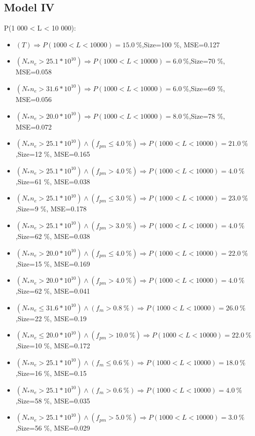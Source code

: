 \documentclass[numbered]{CSL}
\begin{document}
\subsection{Model IV}
P(1 000 < L < 10 000):
\begin{itemize}
\item $(T) \Rightarrow P(1 000 < L < 10 000) = 15.0~\%$,\hfill Size=100 \%, MSE=0.127
\item $(N_* n_e > 25.1 * 10^{10}) \Rightarrow P(1 000 < L < 10 000) = 6.0~\%$,\hfill Size=70 \%, MSE=0.058
\item $(N_* n_e > 31.6 * 10^{10}) \Rightarrow P(1 000 < L < 10 000) = 6.0~\%$,\hfill Size=69 \%, MSE=0.056
\item $(N_* n_e > 20.0 * 10^{10}) \Rightarrow P(1 000 < L < 10 000) = 8.0~\%$,\hfill Size=78 \%, MSE=0.072
\item $(N_* n_e > 25.1 * 10^{10}) \land (f_{pm} \leq 4.0~\%) \Rightarrow P(1 000 < L < 10 000) = 21.0~\%$,\hfill Size=12 \%, MSE=0.165
\item $(N_* n_e > 25.1 * 10^{10}) \land (f_{pm} > 4.0~\%) \Rightarrow P(1 000 < L < 10 000) = 4.0~\%$,\hfill Size=61 \%, MSE=0.038
\item $(N_* n_e > 25.1 * 10^{10}) \land (f_{pm} \leq 3.0~\%) \Rightarrow P(1 000 < L < 10 000) = 23.0~\%$,\hfill Size=9 \%, MSE=0.178
\item $(N_* n_e > 25.1 * 10^{10}) \land (f_{pm} > 3.0~\%) \Rightarrow P(1 000 < L < 10 000) = 4.0~\%$,\hfill Size=62 \%, MSE=0.038
\item $(N_* n_e > 20.0 * 10^{10}) \land (f_{pm} \leq 4.0~\%) \Rightarrow P(1 000 < L < 10 000) = 22.0~\%$,\hfill Size=15 \%, MSE=0.169
\item $(N_* n_e > 20.0 * 10^{10}) \land (f_{pm} > 4.0~\%) \Rightarrow P(1 000 < L < 10 000) = 4.0~\%$,\hfill Size=62 \%, MSE=0.041
\item $(N_* n_e \leq 31.6 * 10^{10}) \land (f_m > 0.8~\%) \Rightarrow P(1 000 < L < 10 000) = 26.0~\%$,\hfill Size=22 \%, MSE=0.19
\item $(N_* n_e \leq 20.0 * 10^{10}) \land (f_{pm} > 10.0~\%) \Rightarrow P(1 000 < L < 10 000) = 22.0~\%$,\hfill Size=10 \%, MSE=0.172
\item $(N_* n_e > 25.1 * 10^{10}) \land (f_m \leq 0.6~\%) \Rightarrow P(1 000 < L < 10 000) = 18.0~\%$,\hfill Size=16 \%, MSE=0.15
\item $(N_* n_e > 25.1 * 10^{10}) \land (f_m > 0.6~\%) \Rightarrow P(1 000 < L < 10 000) = 4.0~\%$,\hfill Size=58 \%, MSE=0.035
\item $(N_* n_e > 25.1 * 10^{10}) \land (f_{pm} > 5.0~\%) \Rightarrow P(1 000 < L < 10 000) = 3.0~\%$,\hfill Size=56 \%, MSE=0.029

\end{itemize}
\end{document}
